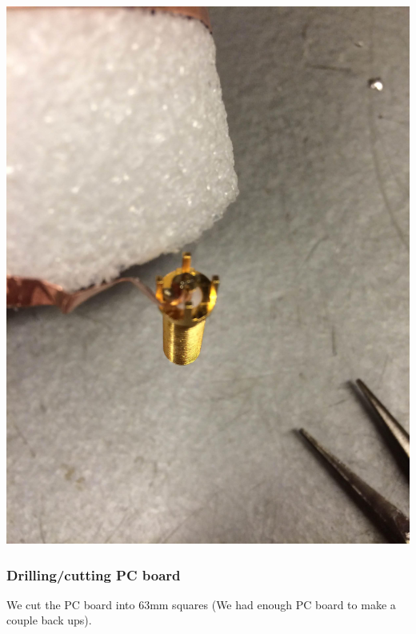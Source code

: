 \documentclass[11pt]{article} %
\begin{document}
\begin{center}
\includegraphics[scale=0.10]{feed/14.jpeg}
\end{center}


\subsubsection{Drilling/cutting PC board}
We cut the PC board into 63mm squares (We had enough PC board to make a couple back ups). 
\end{document}
